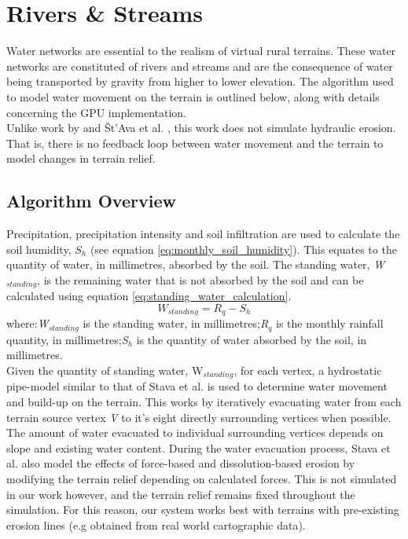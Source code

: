 \section{Rivers \& Streams} \label{sec:rivers_and_streams}

Water networks are essential to the realism of virtual rural terrains. These water networks are constituted of rivers and streams and are the consequence of water being transported by gravity from higher to lower elevation. The algorithm used to model water movement on the terrain is outlined below, along with details concerning the GPU implementation.\\
Unlike work by \cite{Kelley1988} and Št'Ava et al. \cite{StAva2008}, this work does not simulate hydraulic erosion. That is, there is no feedback loop between water movement and the terrain to model changes in terrain relief.

\subsection{Algorithm Overview}

Precipitation, precipitation intensity and soil infiltration are used to calculate the soil humidity, $S_{h}$ (see equation \ref{eq:monthly_soil_humidity}). This equates to the quantity of water, in millimetres, absorbed by the soil. The standing water, \textit{W$_{standing}$}, is the remaining water that is not absorbed by the soil and can be calculated using equation \ref{eq:standing_water_calculation}.\\

\begin{equation} \label{eq:standing_water_calculation}
	W_{standing} = R_{q} - S_{h}
\end{equation}
where:\textit{W$_{standing}$} is the standing water, in millimetres;\textit{R$_{q}$} is the monthly rainfall quantity, in millimetres;\textit{S$_{h}$} is the quantity of water absorbed by the soil, in millimetres.\\

Given the quantity of standing water, W$_{standing}$, for each vertex, a hydrostatic pipe-model similar to that of Stava et al. \cite{StAva2008} is used to determine water movement and build-up on the terrain. This works by iteratively evacuating water from each terrain source vertex \textit{V} to it's eight directly surrounding vertices when possible. The amount of water evacuated to individual surrounding vertices depends on slope and existing water content. During the water evacuation process, Stava et al. \cite{StAva2008} also model the effects of force-based and dissolution-based erosion by modifying the terrain relief depending on calculated forces. This is not simulated in our work however, and the terrain relief remains fixed throughout the simulation. For this reason, our system works best with terrains with pre-existing erosion lines (e.g obtained from real world cartographic data). \\


